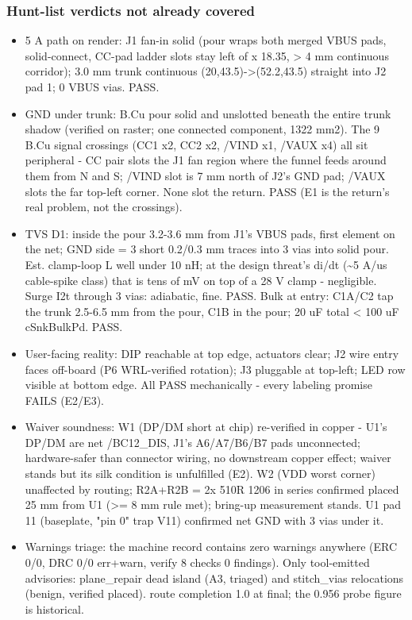 \documentclass[11pt,a4paper]{article}
\begin{document}
\subsubsection*{Hunt-list verdicts not already covered}
\begin{itemize}
\item 5 A path on render: J1 fan-in solid (pour wraps both merged VBUS pads, solid-connect,
CC-pad ladder slots stay left of x 18.35, \textgreater{} 4 mm continuous corridor); 3.0 mm trunk
continuous (20,43.5)-\textgreater{}(52.2,43.5) straight into J2 pad 1; 0 VBUS vias. PASS.
\item GND under trunk: B.Cu pour solid and unslotted beneath the entire trunk shadow
(verified on raster; one connected component, 1322 mm2). The 9 B.Cu signal crossings
(CC1 x2, CC2 x2, /VIND x1, /VAUX x4) all sit peripheral - CC pair slots the J1 fan
region where the funnel feeds around them from N and S; /VIND slot is 7 mm north of
J2's GND pad; /VAUX slots the far top-left corner. None slot the return. PASS
(E1 is the return's real problem, not the crossings).
\item TVS D1: inside the pour 3.2-3.6 mm from J1's VBUS pads, first element on the net; GND
side = 3 short 0.2/0.3 mm traces into 3 vias into solid pour. Est. clamp-loop L well
under 10 nH; at the design threat's di/dt (\textasciitilde{}5 A/us cable-spike class) that is tens of
mV on top of a 28 V clamp - negligible. Surge I2t through 3 vias: adiabatic, fine.
PASS. Bulk at entry: C1A/C2 tap the trunk 2.5-6.5 mm from the pour, C1B in the pour;
20 uF total \textless{} 100 uF cSnkBulkPd. PASS.
\item User-facing reality: DIP reachable at top edge, actuators clear; J2 wire entry faces
off-board (P6 WRL-verified rotation); J3 pluggable at top-left; LED row visible at
bottom edge. All PASS mechanically - every labeling promise FAILS (E2/E3).
\item Waiver soundness: W1 (DP/DM short at chip) re-verified in copper - U1's DP/DM are
net /BC12\_DIS, J1's A6/A7/B6/B7 pads unconnected; hardware-safer than connector
wiring, no downstream copper effect; waiver stands but its silk condition is
unfulfilled (E2). W2 (VDD worst corner) unaffected by routing; R2A+R2B = 2x 510R
1206 in series confirmed placed 25 mm from U1 (\textgreater{}= 8 mm rule met); bring-up
measurement stands. U1 pad 11 (baseplate, "pin 0" trap V11) confirmed net GND with
3 vias under it.
\item Warnings triage: the machine record contains zero warnings anywhere (ERC 0/0, DRC
0/0 err+warn, verify 8 checks 0 findings). Only tool-emitted advisories: plane\_repair
dead island (A3, triaged) and stitch\_vias relocations (benign, verified placed).
route completion 1.0 at final; the 0.956 probe figure is historical.
\end{itemize}
\end{document}
